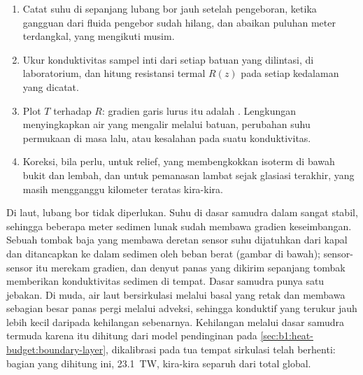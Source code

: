 \begin{method}\label{met:b1:heat-budget:borehole}
\begin{enumerate}
  \item Catat suhu di sepanjang lubang bor jauh setelah pengeboran, ketika gangguan dari fluida pengebor sudah hilang, dan abaikan puluhan meter terdangkal, yang mengikuti musim.
  \item Ukur konduktivitas sampel inti dari setiap batuan yang dilintasi, di laboratorium, dan hitung resistansi termal $R(z)$ pada setiap kedalaman yang dicatat.
  \item Plot $T$ terhadap $R$: gradien garis lurus itu adalah . Lengkungan menyingkapkan air yang mengalir melalui batuan, perubahan suhu permukaan di masa lalu, atau kesalahan pada suatu konduktivitas.
  \item Koreksi, bila perlu, untuk relief, yang membengkokkan isoterm di bawah bukit dan lembah, dan untuk pemanasan lambat sejak glasiasi terakhir, yang masih mengganggu kilometer teratas kira-kira.
\end{enumerate}
\end{method}

Di laut, lubang bor tidak diperlukan. Suhu di dasar samudra dalam sangat stabil, sehingga beberapa meter sedimen lunak sudah membawa gradien keseimbangan. Sebuah tombak baja yang membawa deretan sensor suhu dijatuhkan dari kapal dan ditancapkan ke dalam sedimen oleh beban berat (gambar di bawah); sensor-sensor itu merekam gradien, dan denyut panas yang dikirim sepanjang tombak memberikan konduktivitas sedimen di tempat.
Dasar samudra punya satu jebakan. Di  muda, air laut bersirkulasi melalui basal yang retak dan membawa sebagian besar panas pergi melalui adveksi, sehingga  konduktif yang terukur jauh lebih kecil daripada kehilangan sebenarnya. Kehilangan melalui dasar samudra termuda karena itu dihitung dari model pendinginan pada \cref{sec:b1:heat-budget:boundary-layer}, dikalibrasi pada  tua tempat sirkulasi telah berhenti: bagian yang dihitung ini, \qty{23.1}{TW}, 
kira-kira separuh dari total global. %

